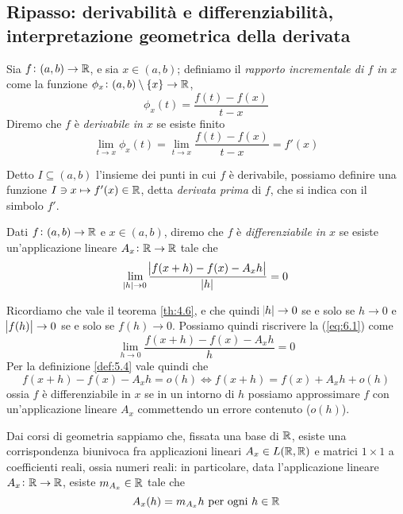 \subsection{Ripasso: derivabilità e differenziabilità, interpretazione geometrica della derivata}
\begin{definition}
    \label{def:6.1}
    Sia $f\colon(a,b)\to\amsbb{R}$, e sia $x\in(a,b)$; definiamo il \emph{rapporto incrementale di $f$ in $x$} come la funzione $\phi_x \colon (a,b) \setminus \{x\} \to \amsbb{R}$,
    \[
    \phi_x(t) = \frac{f(t)-f(x)}{t-x}
    \]
    Diremo che $f$ è \emph{derivabile in $x$} se esiste finito
    \begin{equation}
        \label{eq:6.1}
        \lim_{t\to x} \phi_x(t) = \lim_{t\to x} \frac{f(t)-f(x)}{t-x} = f'(x)
    \end{equation}
\end{definition}
\begin{remark}
    Detto $I\subseteq (a,b)$ l'insieme dei punti in cui $f$ è derivabile, possiamo definire una funzione $ I\ni x \mapsto f'(x)\in \amsbb{R}$, detta \emph{derivata prima} di $f$, che si indica con il simbolo $f'$.
\end{remark}
\begin{definition}
    \label{def:6.2}
    Dati $f\colon(a,b)\to\amsbb{R}$ e $x\in(a,b)$, diremo che $f$ è \emph{differenziabile in $x$} se esiste un'applicazione lineare $A_x\colon\amsbb{R}\to \amsbb{R}$ tale che
    \begin{equation}
        \label{eq:6.2}
        \lim_{\abs{h}\to0}\frac{\abs{f(x+h)-f(x)-A_x h}}{\abs{h}}=0
    \end{equation}
\end{definition}
\begin{remark}
    Ricordiamo che vale il teorema \ref{th:4.6}, e che quindi $\abs{h}\to 0$ se e solo se $h\to0$ e $\abs{f(h)}\to0$ se e solo se $f(h)\to0$. Possiamo quindi riscrivere la (\ref{eq:6.1}) come
    \[
    \lim_{h\to 0} \frac{f(x+h)-f(x)-A_x h}{h}=0
    \]
    Per la definizione \ref{def:5.4} vale quindi che
    \[
    f(x+h)-f(x)-A_xh = o(h) \iff f(x+h) = f(x) + A_x h+o(h)
    \]
    ossia $f$ è differenziabile in $x$ se in un intorno di $h$ possiamo approssimare $f$ con un'applicazione lineare $A_x$ commettendo un errore contenuto ($o(h)$).
\end{remark}
\begin{remark}
    Dai corsi di geometria sappiamo che, fissata una base di $\amsbb{R}$, esiste una corrispondenza biunivoca fra applicazioni lineari $A_x\in L(\amsbb{R}, \amsbb{R})$ e matrici $1\times 1$ a coefficienti reali, ossia numeri reali: in particolare, data l'applicazione lineare $A_x\colon \amsbb{R}\to\amsbb{R}$, esiste $m_{A_x}\in\amsbb{R}$ tale che
    \[
    A_x(h) = m_{A_x}h \ \text{per ogni} \ h\in\amsbb{R}
    \]
\end{remark}
